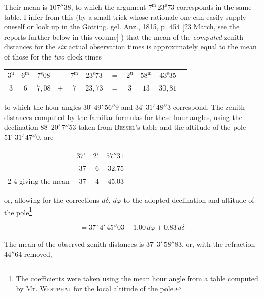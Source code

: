 \noindent Their mean is $107''38$, to which the argument $7^{\mathrm m}\,23^{\mathrm s}73$ corresponds in the same table. I infer from this (by a small trick whose rationale one can easily supply oneself or look up in the Götting. gel. Anz., 1815, p. 454 [23 March, see the reports further below in this volume] ) that the mean of the \emph{computed} zenith distances for the \emph{six} actual observation times is approximately equal to the mean of those for the \emph{two} clock times

\begin{center}\fontsize{9}{11}\selectfont\setlength{\tabcolsep}{3pt}\begin{tabular}{ccccccccccc}
$3^{\mathrm u}$ & $6^{\mathrm m}$ & $7^{\mathrm s}08$ & $-$ & $7^{\mathrm m}$ & $23^{\mathrm s}73$ & $=$ & $2^{\mathrm u}$ & $58^{\mathrm m}$ & $43^{\mathrm s}35$\\
$3$ & $6$ & $7{,}08$ & $+$ & $7$ & $23{,}73$ & $=$ & $3$ & $13$ & $30{,}81$\\
\end{tabular}\end{center}

\noindent to which the hour angles $30^\circ\,49'\,56''9$ and $34^\circ\,31'\,48''3$ correspond. The zenith distances computed by the familiar formulas for these hour angles, using the declination $88^\circ\,20'\,7''53$ taken from \textsc{Bessel}’s table and the altitude of the pole $51^\circ\,31'\,47''0$, are

\begin{center}\fontsize{10}{12}\selectfont\begin{tabular}{lrrr}
& $37^\circ$ & $2'$ & $57''31$\\
& $37$ & $6$ & $32.75$\\\cline{2-4}
giving the mean & $37$ & $4$ & $45.03$\\
\end{tabular}\end{center}
\noindent or, allowing for the corrections $d\delta$, $d\varphi$ to the adopted declination and altitude of the pole\footnote{The coefficients were taken using the mean hour angle from a table computed by Mr. \textsc{Westphal} for the local altitude of the pole.}

\[ = 37^\circ\,4'\,45''03 - 1.00\,d\varphi + 0.83\,d\delta \]

\par\indent The mean of the observed zenith distances is $37^\circ\,3'\,58''83$, or, with the refraction $44''64$ removed,

